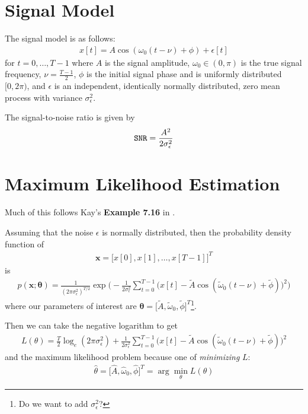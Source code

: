 \documentclass[11pt]{article}
\newcommand{\bx}{\mathbf{x}}
\begin{document}
\section{Signal Model}

The signal model is as follows:
\begin{align}
x[t] = A \cos(\omega_0(t-\nu) + \phi) + \epsilon[t] 
\end{align}
for $t = 0, \ldots, T-1$ where $A$ is the signal amplitude, $\omega_0 \in (0,  \pi)$ is the true signal frequency, $\nu = \frac{T-1}{2}$, $\phi$ is the initial signal phase and is uniformly distributed $[0, 2\pi)$, and  $\epsilon$ is an independent, identically normally distributed, zero mean process with variance $\sigma_\epsilon^2$.

The signal-to-noise ratio is given by
\begin{align}
{\tt SNR} =  \frac{A^2}{2 \sigma_\epsilon^2}
\end{align}

\section{Maximum Likelihood Estimation}

Much of this follows Kay's {\bf Example 7.16} in \cite{Kay1997}.

Assuming that the noise $\epsilon$ is normally distributed, then the probability density function of 
\begin{align}
\bx = \Big[x[0], x[1], \ldots, x[T-1] \Big]^T 
\end{align}
is 
\begin{align}
p(\bx ; \mathbf{\theta}) = \frac{1}{(2\pi \sigma_\epsilon^2)^{T/2} }
 \exp\Big(  -\frac{1}{2\sigma_\epsilon^2} \sum_{t=0}^{T-1} \big(x[t] - \tilde{A} \cos(\tilde{\omega}_0(t-\nu) + \tilde{\phi}) \big)^2 \Big)
\end{align}
where our parameters of interest are $\mathbf{\theta} = \Big [ \tilde{A}, \tilde{\omega}_0, \tilde{\phi} \Big ]^T$\footnote{Do we want to add $\sigma_\epsilon^2$?}.

Then we can take the negative logarithm to get
\begin{align}
L(\theta) = \frac{T}{2}\log_e(2\pi \sigma_\epsilon^2)  + \frac{1}{2\sigma_\epsilon^2} \sum_{t=0}^{T-1} \big(x[t] - \tilde{A} \cos(\tilde{\omega}_0(t-\nu) + \tilde{\phi}) \big)^2 
\end{align}
and the maximum likelihood problem because one of {\em minimizing} $L$:
\begin{align}
\hat{\theta} =  \Big [ \hat{A}, \hat{\omega}_0, \hat{\phi} \Big ]^T =  \arg \min_{\theta} L(\theta)
\end{align}
\end{document}
